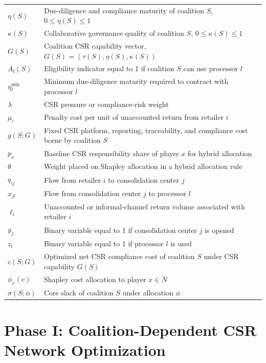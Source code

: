 \begin{table}[htbp]
{\begin{tabular}{ll}
$\eta(S)$ & Due-diligence and compliance maturity of coalition $S$, $0\leq \eta(S)\leq 1$ \\
$\kappa(S)$ & Collaborative governance quality of coalition $S$, $0\leq \kappa(S)\leq 1$ \\
$G(S)$ & Coalition CSR capability vector, $G(S)=(\tau(S),\eta(S),\kappa(S))$ \\
$A_l(S)$ & Eligibility indicator equal to 1 if coalition $S$ can use processor $l$ \\
$\eta_l^{\min}$ & Minimum due-diligence maturity required to contract with processor $l$ \\
$\lambda$ & CSR pressure or compliance-risk weight \\
$\mu_i$ & Penalty cost per unit of unaccounted return from retailer $i$ \\
$g(S;G)$ & Fixed CSR platform, reporting, traceability, and compliance cost borne by coalition $S$ \\
$p_x$ & Baseline CSR responsibility share of player $x$ for hybrid allocation \\
$\theta$ & Weight placed on Shapley allocation in a hybrid allocation rule \\
\midrule
$q_{ij}$ & Flow from retailer $i$ to consolidation center $j$ \\
$x_{jl}$ & Flow from consolidation center $j$ to processor $l$ \\
$\ell_i$ & Unaccounted or informal-channel return volume associated with retailer $i$ \\
$y_j$ & Binary variable equal to 1 if consolidation center $j$ is opened \\
$z_l$ & Binary variable equal to 1 if processor $l$ is used \\
$c(S;G)$ & Optimized net CSR compliance cost of coalition $S$ under CSR capability $G(S)$ \\
$\phi_x(c)$ & Shapley cost allocation to player $x\in N$ \\
$\sigma(S;\phi)$ & Core slack of coalition $S$ under allocation $\phi$ \\
\bottomrule
\end{tabular}%
}
\end{table}

\section{Phase I: Coalition-Dependent CSR Network Optimization}
\label{sec:milp}

